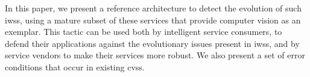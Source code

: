 










In this paper, we present a reference architecture to detect the evolution of such \glspl{iws}, using a mature subset of these services that provide computer vision as an exemplar. This tactic can be used both by intelligent service consumers, to defend their applications against the evolutionary issues present in \glspl{iws}, and by service vendors to make their services more robust. We also present a set of error conditions that occur in existing \glspl{cvs}.  







